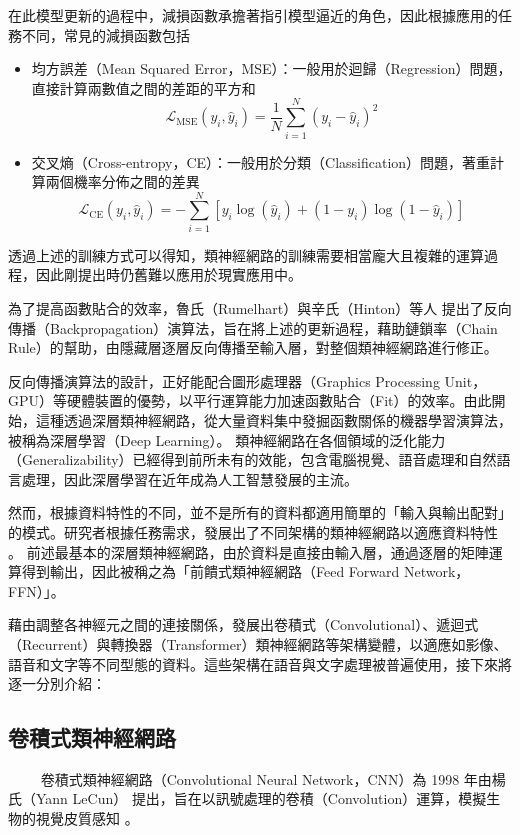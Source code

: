 在此模型更新的過程中，減損函數承擔著指引模型逼近的角色，因此根據應用的任務不同，常見的減損函數包括
\begin{itemize}
    \item 均方誤差（Mean Squared Error，MSE）：一般用於迴歸（Regression）問題，直接計算兩數值之間的差距的平方和
    $$\mathcal{L}_{\text{MSE}}(y_i, \hat{y}_i) = \frac{1}{N} \sum_{i=1}^{N} (y_i - \hat{y}_i)^2$$

    \item 交叉熵（Cross-entropy，CE）：一般用於分類（Classification）問題，著重計算兩個機率分佈之間的差異
    $$\mathcal{L}_{\text{CE}}(y_i, \hat{y}_i) = -  \sum_{i=1}^{N} \left[ y_i \log(\hat{y}_i) + (1 - y_i) \log(1 - \hat{y}_i) \right]$$
\end{itemize}

透過上述的訓練方式可以得知，類神經網路的訓練需要相當龐大且複雜的運算過程，因此剛提出時仍舊難以應用於現實應用中。

為了提高函數貼合的效率，魯氏（Rumelhart）與辛氏（Hinton）等人 \cite{rumelhart_learning_1986, rumelhart_learning_1987} 提出了反向傳播（Backpropagation）演算法，旨在將上述的更新過程，藉助鏈鎖率（Chain Rule）的幫助，由隱藏層逐層反向傳播至輸入層，對整個類神經網路進行修正。

反向傳播演算法的設計，正好能配合圖形處理器（Graphics Processing Unit，GPU）等硬體裝置的優勢，以平行運算能力加速函數貼合（Fit）的效率。由此開始，這種透過深層類神經網路，從大量資料集中發掘函數關係的機器學習演算法，被稱為深層學習（Deep Learning）。 類神經網路在各個領域的泛化能力（Generalizability）已經得到前所未有的效能，包含電腦視覺、語音處理和自然語言處理，因此深層學習在近年成為人工智慧發展的主流。

然而，根據資料特性的不同，並不是所有的資料都適用簡單的「輸入與輸出配對」的模式。研究者根據任務需求，發展出了不同架構的類神經網路以適應資料特性  。
前述最基本的深層類神經網路，由於資料是直接由輸入層，通過逐層的矩陣運算得到輸出，因此被稱之為「前饋式類神經網路（Feed Forward Network，FFN）」。

藉由調整各神經元之間的連接關係，發展出卷積式（Convolutional）、遞迴式（Recurrent）與轉換器（Transformer）類神經網路等架構變體，以適應如影像、語音和文字等不同型態的資料。這些架構在語音與文字處理被普遍使用，接下來將逐一分別介紹：

\subsection{卷積式類神經網路}
　　
卷積式類神經網路（Convolutional Neural Network，CNN）為 1998 年由楊氏（Yann LeCun） \cite{lecun_gradient-based_1998} 提出，旨在以訊號處理的卷積（Convolution）運算，模擬生物的視覺皮質感知 \cite{hubel_receptive_1959} 。

